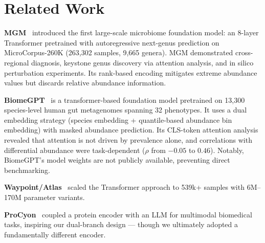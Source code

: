 \documentclass[11pt,a4paper]{article}
\begin{document}
\section{Related Work}

\textbf{MGM}~\cite{mgm2024} introduced the first large-scale microbiome foundation model: an 8-layer Transformer pretrained with autoregressive next-genus prediction on MicroCorpus-260K (263,302 samples, 9,665 genera). MGM demonstrated cross-regional diagnosis, keystone genus discovery via attention analysis, and in silico perturbation experiments. Its rank-based encoding mitigates extreme abundance values but discards relative abundance information.

\textbf{BiomeGPT}~\cite{biomegpt2026} is a transformer-based foundation model pretrained on 13,300 species-level human gut metagenomes spanning 32 phenotypes. It uses a dual embedding strategy (species embedding + quantile-based abundance bin embedding) with masked abundance prediction. Its CLS-token attention analysis revealed that attention is not driven by prevalence alone, and correlations with differential abundance were task-dependent ($\rho$ from $-0.05$ to $0.46$). Notably, BiomeGPT's model weights are not publicly available, preventing direct benchmarking.

\textbf{Waypoint/Atlas}~\cite{waypoint2026} scaled the Transformer approach to 539k+ samples with 6M--170M parameter variants.

\textbf{ProCyon}~\cite{procyon2025} coupled a protein encoder with an LLM for multimodal biomedical tasks, inspiring our dual-branch design --- though we ultimately adopted a fundamentally different encoder.
\end{document}
